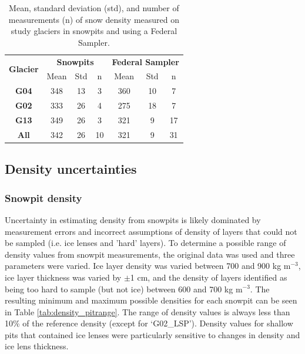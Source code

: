 \documentclass[12pt]{article}
\begin{document}
\begin{table}[b!]
\centering
\caption{Mean, standard deviation (std), and number of measurements (n) of snow density measured on study glaciers in snowpits and using a Federal Sampler. }
\label{tab:density_stats}
\begin{tabular}{ccccccc}
\multirow{2}{*}{\textbf{Glacier}} & \multicolumn{3}{c}{\textbf{Snowpits}}     & \multicolumn{3}{c}{\textbf{Federal Sampler}} \\ 
                                  & Mean & Std & n & Mean  & Std  & n \\ \hline
\textbf{G04}                      & 348           & 13           & 3          & 360            & 10            & 7           \\
\textbf{G02}                      & 333           & 26           & 4          & 275            & 18            & 7           \\
\textbf{G13}                      & 349           & 26           & 3         & 321            & 9             & 17          \\
\textbf{All}                      & 342           & 26           & 10         & 321            & 9             & 31         
\end{tabular}
\end{table}

\subsection*{Density uncertainties}

\subsubsection*{Snowpit density}

Uncertainty in estimating density from snowpits is likely dominated by measurement errors and incorrect assumptions of density of layers that could not be sampled (i.e. ice lenses and 'hard' layers). To determine a possible range of density values from snowpit measurements, the original data was used and three parameters were varied. Ice layer density was varied between 700 and 900 kg m$^{-3}$, ice layer thickness was varied by $\pm$1 cm, and the density of layers identified as being too hard to sample (but not ice) between 600 and 700 kg m$^{-3}$. The resulting minimum and maximum possible densities for each snowpit can be seen in Table \ref{tab:density_pitrange}. The range of density values is always less than 10\% of the reference density (except for `G02\_LSP'). Density values for shallow pits that contained ice lenses were particularly sensitive to changes in density and ice lens thickness. 
\end{document}
